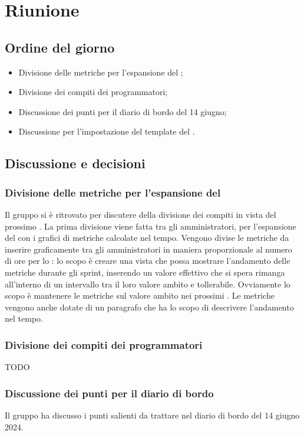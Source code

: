 \section{Riunione}
\subsection{Ordine del giorno}
\begin{itemize}
	\item Divisione delle metriche per l'espansione del \PdQ;
	\item Divisione dei compiti dei programmatori;
	\item Discussione dei punti per il diario di bordo del 14 giugno;
	\item Discussione per l'impostazione del template del .
\end{itemize}

\subsection{Discussione e decisioni}
\subsubsection{Divisione delle metriche per l'espansione del \PdQ}
\par Il gruppo si è ritrovato per discutere della divisione dei compiti in vista del prossimo . 
La prima divisione viene fatta tra gli amministratori, per l'espansione del \PdQ con i grafici di metriche calcolate nel tempo. 
Vengono divise le metriche da inserire graficamente tra gli amministratori in maniera proporzionale al numero di ore per lo : lo scopo è creare una vista che possa mostrare l'andamento delle metriche durante gli sprint, inserendo un valore effettivo che si spera rimanga all'interno di un intervallo tra il loro valore ambito e tollerabile. 
Ovviamente lo scopo è mantenere le metriche sul valore ambito nei prossimi .
Le metriche vengono anche dotate di un paragrafo che ha lo scopo di descrivere l'andamento nel tempo.

\subsubsection{Divisione dei compiti dei programmatori}
TODO

\subsubsection{Discussione dei punti per il diario di bordo}
\par Il gruppo ha discusso i punti salienti da trattare nel diario di bordo del 14 giugno 2024.

